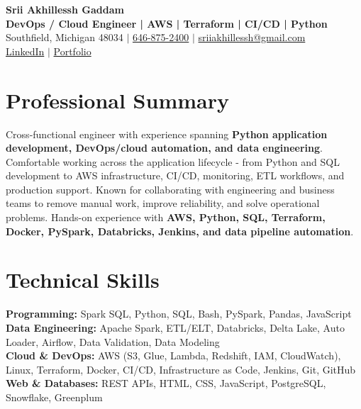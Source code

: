 \documentclass[letterpaper,10pt]{article}
\begin{document}
\fontsize{9.35pt}{10.45pt}\selectfont

\begin{center}
    {\LARGE \textbf{Srii Akhillessh Gaddam}} \\[-1pt]
    \textbf{DevOps / Cloud Engineer | AWS | Terraform | CI/CD | Python} \\[2pt]
    Southfield, Michigan 48034 $|$
    \href{tel:6468752400}{646-875-2400} $|$
    \href{mailto:sriiakhillessh@gmail.com}{sriiakhillessh@gmail.com} \\[1pt]
    \href{https://www.linkedin.com/in/srii-akhiilessh-gaddam-b48668191/}{LinkedIn} $|$
    \href{https://sriiakhillesshg.github.io/portfolio/}{Portfolio}
\end{center}
\vspace{-8pt}

\section{Professional Summary}
\small{Cross-functional engineer with experience spanning \textbf{Python application development, DevOps/cloud automation, and data engineering}. Comfortable working across the application lifecycle - from Python and SQL development to AWS infrastructure, CI/CD, monitoring, ETL workflows, and production support. Known for collaborating with engineering and business teams to remove manual work, improve reliability, and solve operational problems. Hands-on experience with \textbf{AWS, Python, SQL, Terraform, Docker, PySpark, Databricks, Jenkins, and data pipeline automation}.}

\section{Technical Skills}
\small{
\textbf{Programming:} Spark SQL, Python, SQL, Bash, PySpark, Pandas, JavaScript \\
\textbf{Data Engineering:} Apache Spark, ETL/ELT, Databricks, Delta Lake, Auto Loader, Airflow, Data Validation, Data Modeling \\
\textbf{Cloud \& DevOps:} AWS (S3, Glue, Lambda, Redshift, IAM, CloudWatch), Linux, Terraform, Docker, CI/CD, Infrastructure as Code, Jenkins, Git, GitHub \\
\textbf{Web \& Databases:} REST APIs, HTML, CSS, JavaScript, PostgreSQL, Snowflake, Greenplum
}
\end{document}
